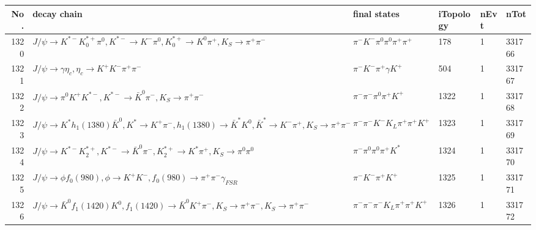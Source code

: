 \begin{table}[htbp] 
\begin{center}
\begin{small}
\begin{tabular}{rlllll}\hline\hline
 No. & decay chain & final states &  iTopology & nEvt & nTot \\\hline
1320&$J/\psi       \rightarrow K^{*-}         K_{0}^{*+}     \pi^{0}        , K^{*-}          \rightarrow K^{-}          \pi^{0}        , K_{0}^{*+}      \rightarrow K^{0}          \pi^{+}        , K_{S}           \rightarrow \pi^{+}        \pi^{-}        $&$\pi^{-}        K^{-}          \pi^{0}        \pi^{0}        \pi^{+}        \pi^{+}        $&  178&    1&331766\\
1321&$J/\psi       \rightarrow \gamma       \eta_{c}    , \eta_{c}     \rightarrow K^{+}          K^{-}          \pi^{+}        \pi^{-}        $&$\pi^{-}        K^{-}          \pi^{+}        \gamma       K^{+}          $&  504&    1&331767\\
1322&$J/\psi       \rightarrow \pi^{0}        K^{+}          K^{*-}         , K^{*-}          \rightarrow \bar{K}^{0}   \pi^{-}        , K_{S}           \rightarrow \pi^{+}        \pi^{-}        $&$\pi^{-}        \pi^{-}        \pi^{0}        \pi^{+}        K^{+}          $& 1322&    1&331768\\
1323&$J/\psi       \rightarrow K^{*}          h_{1}(1380)    \bar{K}^{0}   , K^{*}           \rightarrow K^{+}          \pi^{-}        , h_{1}(1380)     \rightarrow \bar{K}^{*}   K^{0}          , \bar{K}^{*}    \rightarrow K^{-}          \pi^{+}        , K_{S}           \rightarrow \pi^{+}        \pi^{-}        $&$\pi^{-}        \pi^{-}        K^{-}          K_{L}          \pi^{+}        \pi^{+}        K^{+}          $& 1323&    1&331769\\
1324&$J/\psi       \rightarrow K^{*-}         K_2^{*+}       , K^{*-}          \rightarrow \bar{K}^{0}   \pi^{-}        , K_2^{*+}        \rightarrow K^{*}          \pi^{+}        , K_{S}           \rightarrow \pi^{0}        \pi^{0}        $&$\pi^{-}        \pi^{0}        \pi^{0}        \pi^{+}        K^{*}          $& 1324&    1&331770\\
1325&$J/\psi       \rightarrow \phi           f_{0}(980)     , \phi            \rightarrow K^{+}          K^{-}          , f_{0}(980)      \rightarrow \pi^{+}        \pi^{-}        \gamma_{FSR} $&$\pi^{-}        K^{-}          \pi^{+}        K^{+}          $& 1325&    1&331771\\
1326&$J/\psi       \rightarrow \bar{K}^{0}   f_{1}(1420)    K^{0}          , f_{1}(1420)     \rightarrow \bar{K}^{0}   K^{+}          \pi^{-}        , K_{S}           \rightarrow \pi^{+}        \pi^{-}        , K_{S}           \rightarrow \pi^{+}        \pi^{-}        $&$\pi^{-}        \pi^{-}        \pi^{-}        K_{L}          \pi^{+}        \pi^{+}        K^{+}          $& 1326&    1&331772\\

\end{tabular}
\end{small}
\end{center}
\end{table}
